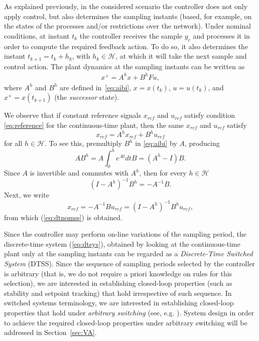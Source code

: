 \documentclass[letterpaper, 10 pt, conference]{ieeeconf}
\newcommand{\Hset}{\mathcal{H}}
\begin{document}
As explained previously, in the considered scenario the controller
does not only apply control, but also determines the sampling instants
(based, for example, on the states of the processes and/or
restrictions over the network). Under nominal conditions, at instant
$t_k$ the controller receives the sample $y_c$ and processes it in
order to compute the required feedback action. To do so, it also
determines the instant $t_{k+1} = t_k+h_k$, with $h_k \in
\mathcal{H}$, at which it will take the next sample and control
action. The plant dynamics at the sampling instants can be written as
\begin{align}
  \label{eq:dtsys}
  x^+ = A^hx+B^hF u,
\end{align}
where $A^h$ and $B^h$ are defined in~\eqref{eq:aibi}, $x=x(t_k)$,
$u=u(t_k)$, and $x^+=x(t_{k+1})$ (the \textit{successor} state).

We observe that if constant reference signals $x_{ref}$ and $u_{ref}$
satisfy condition \eqref{eq:reference} for the continuous-time plant, then the same $x_{ref}$ and $u_{ref}$ satisfy
\begin{equation}
  \label{eq:dtnomss}
  x_{ref} = A^h x_{ref} + B^h u_{ref}
\end{equation}
for all $h\in\Hset$. 
To see this, premultiply $B^h$ in \eqref{eq:aibi} by $A$, producing
\begin{equation}
  A B^h=A\int_0^h e^{A t}dt B = (A^h-I)B.
\end{equation}
Since $A$ is invertible and commutes with $A^h$, then for every
$h\in\mathcal{H}$
\begin{equation}
 \label{eq:idahbh}
   (I-A^h)^{-1}B^h = -A^{-1}B.
\end{equation}  
Next, we write
\begin{equation}
  \label{eq:xrefurefrelation}
x_{ref} = -A^{-1}Bu_{ref} =  (I-A^h)^{-1}B^hu_{ref}, \end{equation}
from which (\ref{eq:dtnomss}) is obtained. 

Since the controller may perform on-line variations of the sampling period, the discrete-time system (\ref{eq:dtsys}), obtained by looking at the continuous-time plant only at the sampling instants can be regarded as a \emph{Discrete-Time Switched System}
(DTSS). Since the sequence of sampling periods selected by the controller is
arbitrary (that is, we do not require a priori knowledge on rules for
this selection), we are interested in establishing closed-loop properties (such as stability and setpoint tracking) that hold irrespective of such sequence. In switched systems terminology, we are interested in establishing closed-loop properties that hold under \emph{arbitrary switching} (see, e.g. \cite{showir_siamrev07,lin09:_stabil}). System design in order to achieve the required closed-loop properties under arbitrary switching will be addressed in Section~\ref{sec:VA}.
\end{document}
